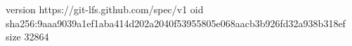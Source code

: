 version https://git-lfs.github.com/spec/v1
oid sha256:9aaa9039a1ef1aba414d202a2040f53955805e068aacb3b926fd32a938b318ef
size 32864
